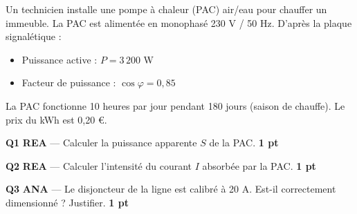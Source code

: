 \documentclass[a4paper,11pt]{article}
\newcommand{\pts}[1]{\hfill\textcolor{gris}{\small\textbf{#1}}}
\newcommand{\comp}[1]{\colorbox{blue!10}{\scriptsize\textbf{#1}}}
\begin{document}
\begin{contextebox}
Un technicien installe une pompe à chaleur (PAC) air/eau pour chauffer un immeuble. La PAC est alimentée en monophasé 230 V / 50 Hz. D'après la plaque signalétique :
\begin{itemize}[nosep]
  \item Puissance active : $P = 3\,200$ W
  \item Facteur de puissance : $\cos\varphi = 0{,}85$
\end{itemize}
La PAC fonctionne 10 heures par jour pendant 180 jours (saison de chauffe). Le prix du kWh est 0,20 €.
\end{contextebox}

\begin{center}
\end{center}

\textbf{Q1} \comp{REA} — Calculer la puissance apparente $S$ de la PAC. \pts{1 pt}

\begin{reponsebox}[3cm]
\dotfill

\dotfill

\dotfill
\end{reponsebox}

\textbf{Q2} \comp{REA} — Calculer l'intensité du courant $I$ absorbée par la PAC. \pts{1 pt}

\begin{reponsebox}[3cm]
\dotfill

\dotfill

\dotfill
\end{reponsebox}

\textbf{Q3} \comp{ANA} — Le disjoncteur de la ligne est calibré à 20 A. Est-il correctement dimensionné ? Justifier. \pts{1 pt}

\begin{reponsebox}[2.5cm]
\dotfill

\dotfill
\end{reponsebox}
\end{document}
